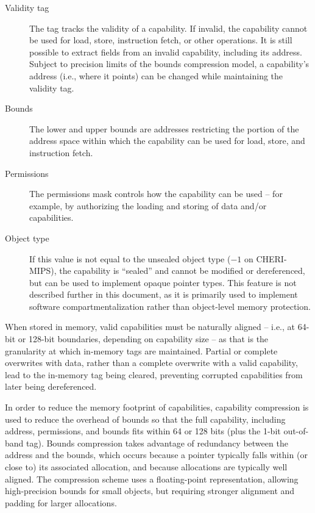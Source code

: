 \documentclass[12pt,twoside,openright,usletter]{article}
\newcommand{\note}[2]{{\color{blue}[ Note: #1 - #2]}}
\renewcommand{\note}[2]{\relax\ifhmode\unskip\fi}
\newcommand{\arnote}[1]{\note{#1}{Alex R.}}
\begin{document}
\begin{description}
\item[Validity tag] The tag tracks the validity of a capability.
  If invalid, the capability cannot be used for load, store, instruction
  fetch, or other operations.
  It is still possible to extract fields from an invalid capability,
  including its address.
  Subject to precision limits of the bounds compression model, a capability's
  address (i.e., where it points) can be changed while maintaining the
  validity tag.

\item[Bounds] The lower and upper bounds are addresses restricting the
  portion of the address space within which the capability can be used for
  load, store, and instruction fetch.

\item[Permissions] The permissions mask controls how the capability can be
  used -- for example, by authorizing the loading and storing of data and/or
  capabilities.

\item[Object type] If this value is not equal to the unsealed object type ($-1$ on CHERI-MIPS), the capability is ``sealed'' and
  cannot be modified or dereferenced, but can be used to implement opaque
  pointer types.
  This feature is not described further in this document, as it is primarily
  used to implement software compartmentalization rather than object-level
  memory protection.\arnote{Should we mention that code pointers are sealed (sentries)?}
\end{description}

When stored in memory, valid capabilities must be naturally aligned -- i.e., at
64-bit or 128-bit boundaries, depending on capability size -- as that is the
granularity at which in-memory tags are maintained.
Partial or complete overwrites with data, rather than a complete overwrite
with a valid capability, lead to the in-memory tag being cleared, preventing
corrupted capabilities from later being dereferenced.

In order to reduce the memory footprint of capabilities, capability
compression is used to reduce the overhead of bounds so that the full
capability, including address, permissions, and bounds fits within 64 or
128 bits (plus the 1-bit out-of-band tag).
Bounds compression takes advantage of redundancy between the address
and the bounds, which occurs because a pointer typically falls within (or
close to) its associated allocation, and because allocations are typically
well aligned.
The compression scheme uses a floating-point representation, allowing high-precision bounds for small
objects, but requiring stronger alignment and padding for larger allocations.
\end{document}
